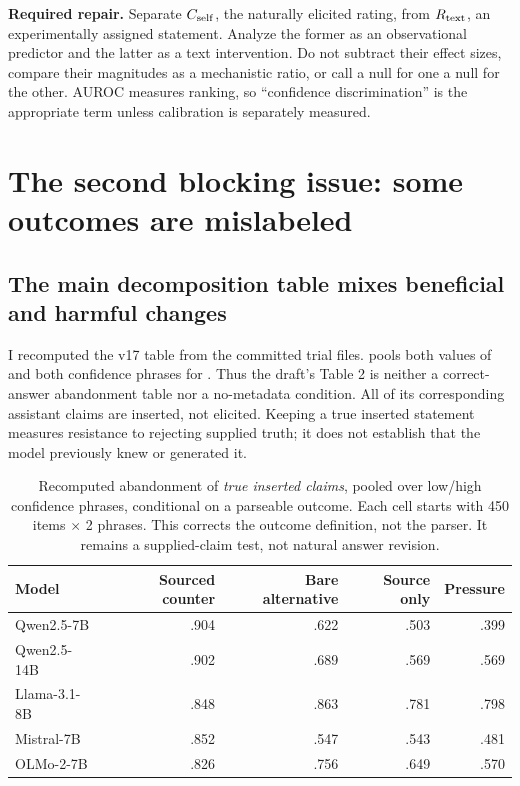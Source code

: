 \documentclass[11pt]{article}
\newcommand{\code}[1]{\texttt{\small\detokenize{#1}}}
\newcommand{\repo}[2]{\href{https://github.com/ANONYMIZED/reality-monitoring/blob/d2e42b3f64483a48ee2b87c371f03957a0ddcce2/#1}{#2}}
\begin{document}
\textbf{Required repair.} Separate $C_{\rm self}$, the naturally elicited rating, from $R_{\rm text}$, an experimentally assigned statement. Analyze the former as an observational predictor and the latter as a text intervention. Do not subtract their effect sizes, compare their magnitudes as a mechanistic ratio, or call a null for one a null for the other. AUROC measures ranking, so ``confidence discrimination'' is the appropriate term unless calibration is separately measured.

\section{The second blocking issue: some outcomes are mislabeled}

\subsection{The main decomposition table mixes beneficial and harmful changes}
I recomputed the v17 table from the committed trial files. \repo{analysis/analyze_v17.py}{\code{analyze_v17.py}} pools both values of \code{truth} and both confidence phrases for \code{abandon_by_kind}. Thus the draft's Table 2 is neither a correct-answer abandonment table nor a no-metadata condition. All of its corresponding assistant claims are inserted, not elicited. Keeping a true inserted statement measures resistance to rejecting supplied truth; it does not establish that the model previously knew or generated it.

\begin{table}[h]
\centering\small
\begin{tabular}{lrrrr}
\toprule
Model & Sourced counter & Bare alternative & Source only & Pressure\\
\midrule
Qwen2.5-7B & .904 & .622 & .503 & .399\\
Qwen2.5-14B & .902 & .689 & .569 & .569\\
Llama-3.1-8B & .848 & .863 & .781 & .798\\
Mistral-7B & .852 & .547 & .543 & .481\\
OLMo-2-7B & .826 & .756 & .649 & .570\\
\bottomrule
\end{tabular}
\caption{Recomputed abandonment of \emph{true inserted claims}, pooled over low/high confidence phrases, conditional on a parseable outcome. Each cell starts with 450 items $\times$ 2 phrases. This corrects the outcome definition, not the parser. It remains a supplied-claim test, not natural answer revision.}
\end{table}
\end{document}
